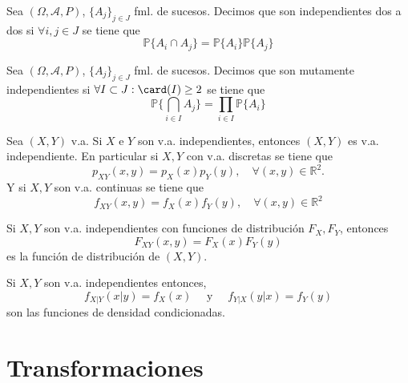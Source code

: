 \begin{defn}
  Sea $(\Omega, \mathcal{A}, P )$, $\{ A_{j} \}_{j \in J}$ fml. de sucesos. Decimos que son independientes dos a dos si $\forall i, j \in J$ se tiene que 
  \[ 
    \mathbb{P} \{ A_{i} \cap A_{j} \} = \mathbb{P} \{ A_{i} \} \mathbb{P} \{ A_{j} \}
  \] 
\end{defn}

\begin{defn}
  Sea $(\Omega, \mathcal{A}, P )$, $\{ A_{j} \}_{j \in J}$ fml. de sucesos. Decimos que son mutamente independientes si $\forall I \subset J : \card(I) \geq 2$ se tiene que 
  \[ 
    \mathbb{P} \{ \bigcap_{i \in I} A_{j} \} = \prod_{i \in I} \mathbb{P} \{ A_{i} \}
  \] 
\end{defn}

\begin{prop}
  Sea $(X,Y)$ v.a. Si $X$ e $Y$ son v.a. independientes, entonces $(X,Y)$ es v.a. independiente. En particular si $X, Y$ con v.a. discretas se tiene que 
  \[ 
    p_{XY}(x,y) = p_{X}(x) p_{Y}(y) ,  \quad \forall (x,y) \in \mathbb{R}^{2}.
  \] 
  Y si $X, Y$ son v.a. continuas se tiene que
  \[ 
    f_{XY}(x,y) = f_{X}(x) f_{Y}(y), \quad \forall (x,y) \in \mathbb{R}^{2}
  \] 
\end{prop}

\begin{obs}
  Si $X,Y$ son v.a. independientes con funciones de distribución $F_{X}, F_{Y}$, entonces
  \[
    F_{XY}(x,y) = F_{X}(x) F_{Y}(y)
  \]
  es la función de distribución de $(X,Y)$.
\end{obs}

\begin{obs}
  Si $X, Y$ son v.a. independientes entonces, 
  \[ 
    f_{X|Y}(x|y) = f_{X}(x) \quad \text{ y } \quad f_{Y|X}(y|x) = f_{Y}(y)
  \] 
  son las funciones de densidad condicionadas.
\end{obs}

\section{Transformaciones}

